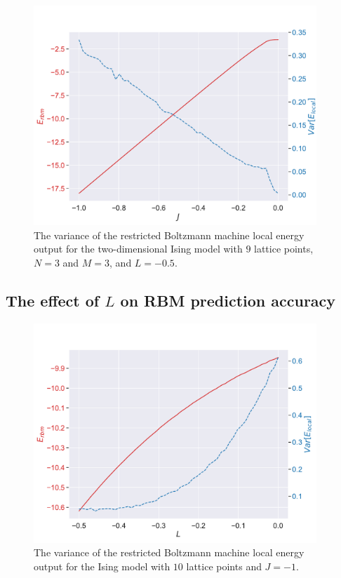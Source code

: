 \begin{figure}[H]
  \begin{center}
    \includegraphics[width=0.95\textwidth]{Figures/Plots/Ising/[J][-1.0-0.0][e=500][n=9][L=-0.5]}
  \end{center}
  \caption{The variance of the restricted Boltzmann machine local energy output for the two-dimensional Ising model with $9$ lattice points, $N=3$ and $M=3$, and $L=-0.5$.}
\end{figure}
\subsection{The effect of \texorpdfstring{$L$}{L} on RBM prediction accuracy}

\begin{figure}[H]
  \begin{center}
    \includegraphics[width=0.95\textwidth]{Figures/Plots/Ising/[L][-0.5-0.0][e=500][n=10][J=-1]}
  \end{center}
  \caption{The variance of the restricted Boltzmann machine local energy output for the Ising model with $10$ lattice points and $J=-1$.}
\end{figure}

